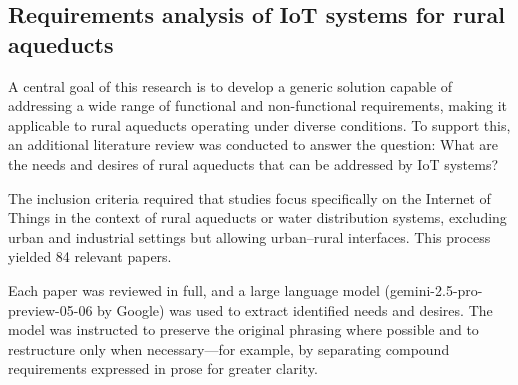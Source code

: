 \documentclass[conference]{IEEEtran}
\begin{document}
\subsection{Requirements analysis of IoT systems for rural aqueducts}
A central goal of this research is to develop a generic solution capable of addressing a wide range of functional and non-functional requirements, making it applicable to rural aqueducts operating under diverse conditions. To support this, an additional literature review was conducted to answer the question: What are the needs and desires of rural aqueducts that can be addressed by IoT systems?

The inclusion criteria required that studies focus specifically on the Internet of Things in the context of rural aqueducts or water distribution systems, excluding urban and industrial settings but allowing urban–rural interfaces. This process yielded 84 relevant papers.

Each paper was reviewed in full, and a large language model (gemini-2.5-pro-preview-05-06 by Google) \cite{gemini-2.5-pro} was used to extract identified needs and desires. The model was instructed to preserve the original phrasing where possible and to restructure only when necessary—for example, by separating compound requirements expressed in prose for greater clarity.

\end{document}
